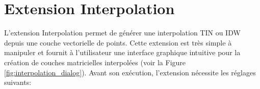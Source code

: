 
\section{Extension Interpolation}


L'extension Interpolation permet de générer une interpolation TIN ou IDW 
depuis une couche vectorielle de points. Cette extension est très simple à 
manipuler et fournit à l'utilisateur une interface graphique intuitive pour la
création de couches matricielles interpolées (voir la Figure \ref{fig:interpolation_dialog}).
Avant son exécution, l'extension nécessite les réglages suivants:

